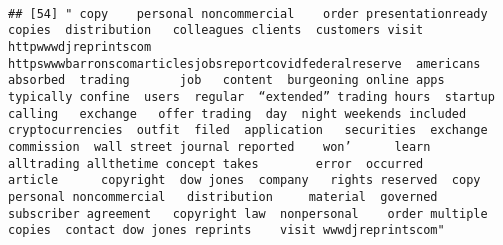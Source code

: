 \documentclass[
]{article}
\begin{document}
\begin{verbatim}
                                                                                                                                                                                                                                                                                                                                                                                                                                                                   
## [54] " copy    personal noncommercial    order presentationready copies  distribution   colleagues clients  customers visit httpwwwdjreprintscom httpswwwbarronscomarticlesjobsreportcovidfederalreserve  americans  absorbed  trading       job   content  burgeoning online apps  typically confine  users  regular  “extended” trading hours  startup calling   exchange   offer trading  day  night weekends included   cryptocurrencies  outfit  filed  application   securities  exchange commission  wall street journal reported    won’      learn     alltrading allthetime concept takes        error  occurred        article      copyright  dow jones  company   rights reserved  copy    personal noncommercial   distribution     material  governed   subscriber agreement   copyright law  nonpersonal    order multiple copies  contact dow jones reprints    visit wwwdjreprintscom"                                                                                                                                                                                                                                                                                                                                                                                                                                                                                                                                                                                                                                                                                                                                                                                                                                                                                                                                                                                                                                                                                                                                                                                                                                                                                                                                                                                                                                                                                                                                                                                                                                                                                                                                                                                                                                                                                                                                                                                                                                                                        
\end{verbatim}
\end{document}
